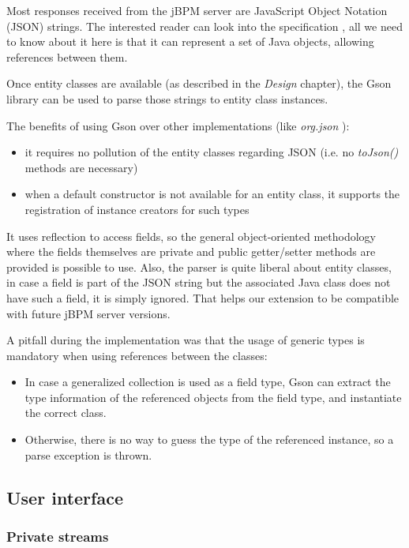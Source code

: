 Most responses received from the jBPM server are JavaScript Object Notation
(JSON) strings. The interested reader can look into the
specification \cite{json}, all we need to know about it here is that it can
represent a set of Java objects, allowing references between them.

Once entity classes are available (as described in the \emph{Design} chapter),
the Gson library \cite{gson} can be used to parse those strings to entity class
instances.

The benefits of using Gson over other implementations (like
\emph{org.json} \cite{org-json}):

\begin{itemize}
\item it requires no pollution of the entity classes regarding JSON (i.e. no \emph{toJson()} methods are necessary)
\item when a default constructor is not available for an entity class, it supports the registration of instance creators for such types
\end{itemize}

It uses reflection to access fields, so the general object-oriented methodology
where the fields themselves are private and public getter/setter methods are
provided is possible to use. Also, the parser is quite liberal about entity
classes, in case a field is part of the JSON string but the associated Java
class does not have such a field, it is simply ignored. That helps our
extension to be compatible with future jBPM server versions.

A pitfall during the implementation was that the usage of generic types is
mandatory when using references between the classes:

\begin{itemize}
\item In case a generalized collection is used as a field type, Gson can extract the type information of the referenced objects from the field type, and instantiate the correct class.
\item Otherwise, there is no way to guess the type of the referenced instance, so a parse exception is thrown.
\end{itemize}

\subsection{User interface}

\subsubsection*{Private streams}

